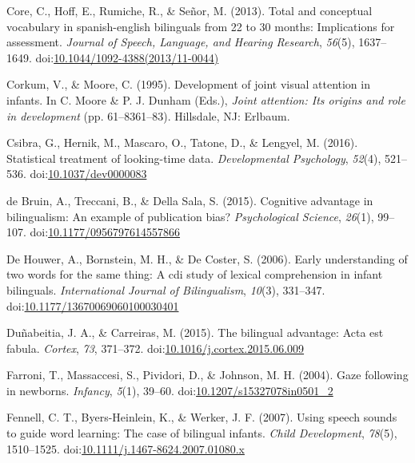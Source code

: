 \documentclass[,man,floatsintext]{apa6}
\begin{document}
\leavevmode\hypertarget{ref-Core_etal_2013}{}%
Core, C., Hoff, E., Rumiche, R., \& Señor, M. (2013). Total and conceptual vocabulary in spanish-english bilinguals from 22 to 30 months: Implications for assessment. \emph{Journal of Speech, Language, and Hearing Research}, \emph{56}(5), 1637--1649. doi:\href{https://doi.org/10.1044/1092-4388(2013/11-0044)}{10.1044/1092-4388(2013/11-0044)}

\leavevmode\hypertarget{ref-Corkum_Moore_1995}{}%
Corkum, V., \& Moore, C. (1995). Development of joint visual attention in infants. In C. Moore \& P. J. Dunham (Eds.), \emph{Joint attention: Its origins and role in development} (pp. 61--8361--83). Hillsdale, NJ: Erlbaum.

\leavevmode\hypertarget{ref-Csibra_etal_2016}{}%
Csibra, G., Hernik, M., Mascaro, O., Tatone, D., \& Lengyel, M. (2016). Statistical treatment of looking-time data. \emph{Developmental Psychology}, \emph{52}(4), 521--536. doi:\href{https://doi.org/10.1037/dev0000083}{10.1037/dev0000083}

\leavevmode\hypertarget{ref-deBruin_etal_2015}{}%
de Bruin, A., Treccani, B., \& Della Sala, S. (2015). Cognitive advantage in bilingualism: An example of publication bias? \emph{Psychological Science}, \emph{26}(1), 99--107. doi:\href{https://doi.org/10.1177/0956797614557866}{10.1177/0956797614557866}

\leavevmode\hypertarget{ref-DeHouwer_etal_2006}{}%
De Houwer, A., Bornstein, M. H., \& De Coster, S. (2006). Early understanding of two words for the same thing: A cdi study of lexical comprehension in infant bilinguals. \emph{International Journal of Bilingualism}, \emph{10}(3), 331--347. doi:\href{https://doi.org/10.1177/13670069060100030401}{10.1177/13670069060100030401}

\leavevmode\hypertarget{ref-Dunabeitia_Carreiras_2015}{}%
Duñabeitia, J. A., \& Carreiras, M. (2015). The bilingual advantage: Acta est fabula. \emph{Cortex}, \emph{73}, 371--372. doi:\href{https://doi.org/10.1016/j.cortex.2015.06.009}{10.1016/j.cortex.2015.06.009}

\leavevmode\hypertarget{ref-Farroni_etal_2004}{}%
Farroni, T., Massaccesi, S., Pividori, D., \& Johnson, M. H. (2004). Gaze following in newborns. \emph{Infancy}, \emph{5}(1), 39--60. doi:\href{https://doi.org/10.1207/s15327078in0501_2}{10.1207/s15327078in0501\_2}

\leavevmode\hypertarget{ref-Fennell_etal_2007}{}%
Fennell, C. T., Byers-Heinlein, K., \& Werker, J. F. (2007). Using speech sounds to guide word learning: The case of bilingual infants. \emph{Child Development}, \emph{78}(5), 1510--1525. doi:\href{https://doi.org/10.1111/j.1467-8624.2007.01080.x}{10.1111/j.1467-8624.2007.01080.x}
\end{document}
